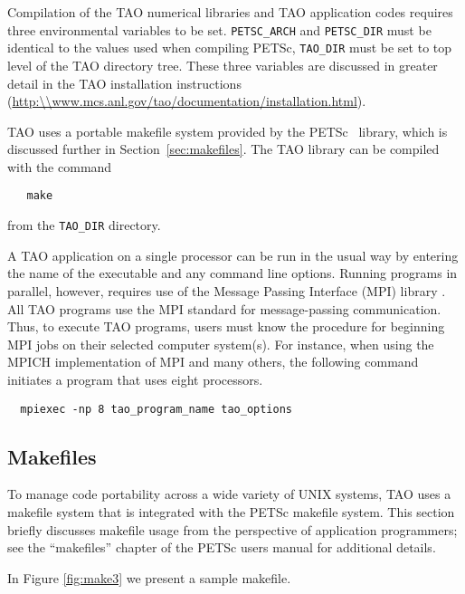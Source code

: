 Compilation of the TAO numerical libraries and TAO application codes
requires three environmental variables to be set. \texttt{PETSC\_ARCH} and \texttt{PETSC\_DIR} must be identical to the values used when compiling PETSc, \texttt{TAO\_DIR} must be set to top level of the TAO directory tree. These three
variables are discussed in greater detail in the TAO installation 
instructions (\url{http:\\www.mcs.anl.gov/tao/documentation/installation.html}).

TAO uses a portable makefile system provided by the
PETSc~\cite{petsc-web-page,petsc-user-ref} library, which is discussed
further in Section~\ref{sec:makefiles}.  The TAO library can be
compiled with the command
\begin{verbatim}
   make
\end{verbatim}
\noindent
from the \texttt{TAO\_DIR} directory.  

A TAO application on a single processor can be run in the
usual way by entering the name of the executable and any command line
options.  Running programs in parallel, however, requires use of the
Message Passing Interface (MPI) library \cite{MPI-final}.  
All TAO programs use the MPI
standard for message-passing communication.  Thus, to
execute TAO programs, users must know the procedure for beginning MPI
jobs on their selected computer system(s).  For instance, when using
the MPICH implementation of MPI \cite{mpich-web-page} and many others,
the following command initiates a program that uses eight processors.
\begin{verbatim}
  mpiexec -np 8 tao_program_name tao_options
\end{verbatim}



\subsection*{Makefiles}
\label{sec:makefiles}

To manage code portability across a wide variety of UNIX systems, TAO
uses a makefile system that is integrated with the PETSc makefile system.  This
section briefly discusses makefile usage from the perspective of
application programmers; see the ``makefiles'' chapter of the PETSc
users manual  \cite{petsc-user-ref} for additional
details.

In Figure \ref{fig:make3} we present a sample makefile.

